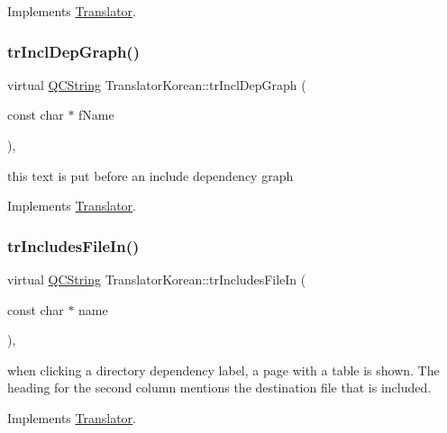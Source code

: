 Implements \mbox{\hyperlink{class_translator}{Translator}}.

\mbox{\label{class_translator_korean_a2e923665c0342077f66fd5a6621aded4}} 
\subsubsection{\texorpdfstring{trInclDepGraph()}{trInclDepGraph()}}
{\footnotesize\ttfamily virtual \mbox{\hyperlink{class_q_c_string}{Q\+C\+String}} Translator\+Korean\+::tr\+Incl\+Dep\+Graph (\begin{DoxyParamCaption}\item[{const char $\ast$}]{f\+Name }\end{DoxyParamCaption})\hspace{0.3cm}{\ttfamily [inline]}, {\ttfamily [virtual]}}

this text is put before an include dependency graph 

Implements \mbox{\hyperlink{class_translator}{Translator}}.

\mbox{\label{class_translator_korean_a2d568d1fedd268dc68a798f79db874cd}} 
\subsubsection{\texorpdfstring{trIncludesFileIn()}{trIncludesFileIn()}}
{\footnotesize\ttfamily virtual \mbox{\hyperlink{class_q_c_string}{Q\+C\+String}} Translator\+Korean\+::tr\+Includes\+File\+In (\begin{DoxyParamCaption}\item[{const char $\ast$}]{name }\end{DoxyParamCaption})\hspace{0.3cm}{\ttfamily [inline]}, {\ttfamily [virtual]}}

when clicking a directory dependency label, a page with a table is shown. The heading for the second column mentions the destination file that is included. 

Implements \mbox{\hyperlink{class_translator}{Translator}}.

\mbox{\label{class_translator_korean_a59f4092697dffe2feb9376d0cdd8c43a}} 
